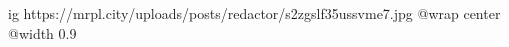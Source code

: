  
 
 
 
 

\ifcmt
  ig https://mrpl.city/uploads/posts/redactor/s2zgslf35ussvme7.jpg
  @wrap center
  @width 0.9
\fi
